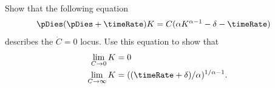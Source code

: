 \item Show that the following equation 
\begin{equation}\begin{gathered}\begin{aligned}
  \pDies(\pDies+\timeRate) K      & =  C(\alpha K^{\alpha-1}-\delta-\timeRate)  \label{eq:CvsK1}
\end{aligned}\end{gathered}\end{equation}
describes the $\dot{C}=0$ locus.  Use this equation to show that
\begin{equation}\begin{gathered}\begin{aligned}
  \label{eq:1}
  \lim_{C \rightarrow 0} K & =  0
\\ \lim_{C \rightarrow \infty} K & =  ((\timeRate+\delta)/\alpha)^{1/{\alpha-1}}.
\end{aligned}\end{gathered}\end{equation}

